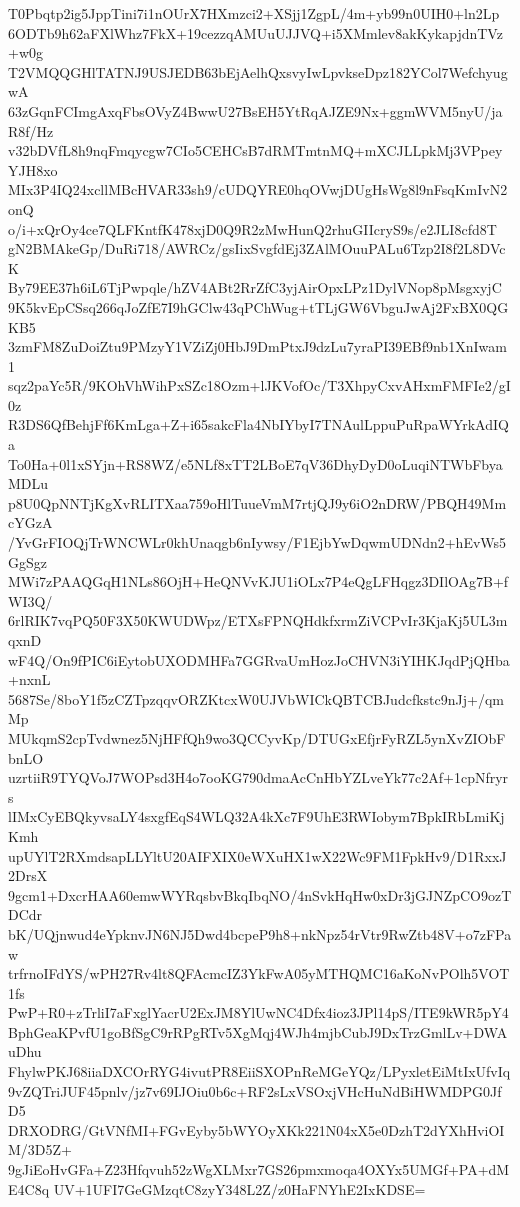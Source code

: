 T0Pbqtp2ig5JppTini7i1nOUrX7HXmzci2+XSjj1ZgpL/4m+yb99n0UIH0+ln2Lp
6ODTb9h62aFXlWhz7FkX+19cezzqAMUuUJJVQ+i5XMmlev8akKykapjdnTVz+w0g
T2VMQQGHlTATNJ9USJEDB63bEjAelhQxsvyIwLpvkseDpz182YCol7WefchyugwA
63zGqnFCImgAxqFbsOVyZ4BwwU27BsEH5YtRqAJZE9Nx+ggmWVM5nyU/jaR8f/Hz
v32bDVfL8h9nqFmqycgw7CIo5CEHCsB7dRMTmtnMQ+mXCJLLpkMj3VPpeyYJH8xo
MIx3P4IQ24xcllMBcHVAR33sh9/cUDQYRE0hqOVwjDUgHsWg8l9nFsqKmIvN2onQ
o/i+xQrOy4ce7QLFKntfK478xjD0Q9R2zMwHunQ2rhuGIIcryS9s/e2JLI8cfd8T
gN2BMAkeGp/DuRi718/AWRCz/gsIixSvgfdEj3ZAlMOuuPALu6Tzp2I8f2L8DVcK
By79EE37h6iL6TjPwpqle/hZV4ABt2RrZfC3yjAirOpxLPz1DylVNop8pMsgxyjC
9K5kvEpCSsq266qJoZfE7I9hGClw43qPChWug+tTLjGW6VbguJwAj2FxBX0QGKB5
3zmFM8ZuDoiZtu9PMzyY1VZiZj0HbJ9DmPtxJ9dzLu7yraPI39EBf9nb1XnIwam1
sqz2paYc5R/9KOhVhWihPxSZc18Ozm+lJKVofOc/T3XhpyCxvAHxmFMFIe2/gI0z
R3DS6QfBehjFf6KmLga+Z+i65sakcFla4NbIYbyI7TNAulLppuPuRpaWYrkAdIQa
To0Ha+0l1xSYjn+RS8WZ/e5NLf8xTT2LBoE7qV36DhyDyD0oLuqiNTWbFbyaMDLu
p8U0QpNNTjKgXvRLITXaa759oHlTuueVmM7rtjQJ9y6iO2nDRW/PBQH49MmcYGzA
/YvGrFIOQjTrWNCWLr0khUnaqgb6nIywsy/F1EjbYwDqwmUDNdn2+hEvWs5GgSgz
MWi7zPAAQGqH1NLs86OjH+HeQNVvKJU1iOLx7P4eQgLFHqgz3DIlOAg7B+fWI3Q/
6rlRIK7vqPQ50F3X50KWUDWpz/ETXsFPNQHdkfxrmZiVCPvIr3KjaKj5UL3mqxnD
wF4Q/On9fPIC6iEytobUXODMHFa7GGRvaUmHozJoCHVN3iYIHKJqdPjQHba+nxnL
5687Se/8boY1f5zCZTpzqqvORZKtcxW0UJVbWICkQBTCBJudcfkstc9nJj+/qmMp
MUkqmS2cpTvdwnez5NjHFfQh9wo3QCCyvKp/DTUGxEfjrFyRZL5ynXvZIObFbnLO
uzrtiiR9TYQVoJ7WOPsd3H4o7ooKG790dmaAcCnHbYZLveYk77c2Af+1cpNfryrs
lIMxCyEBQkyvsaLY4sxgfEqS4WLQ32A4kXc7F9UhE3RWIobym7BpkIRbLmiKjKmh
upUYlT2RXmdsapLLYltU20AIFXIX0eWXuHX1wX22Wc9FM1FpkHv9/D1RxxJ2DrsX
9gcm1+DxcrHAA60emwWYRqsbvBkqIbqNO/4nSvkHqHw0xDr3jGJNZpCO9ozTDCdr
bK/UQjnwud4eYpknvJN6NJ5Dwd4bcpeP9h8+nkNpz54rVtr9RwZtb48V+o7zFPaw
trfrnoIFdYS/wPH27Rv4lt8QFAcmcIZ3YkFwA05yMTHQMC16aKoNvPOlh5VOT1fs
PwP+R0+zTrliI7aFxglYacrU2ExJM8YlUwNC4Dfx4ioz3JPl14pS/ITE9kWR5pY4
BphGeaKPvfU1goBfSgC9rRPgRTv5XgMqj4WJh4mjbCubJ9DxTrzGmlLv+DWAuDhu
FhylwPKJ68iiaDXCOrRYG4ivutPR8EiiSXOPnReMGeYQz/LPyxletEiMtIxUfvIq
9vZQTriJUF45pnlv/jz7v69IJOiu0b6c+RF2sLxVSOxjVHcHuNdBiHWMDPG0JfD5
DRXODRG/GtVNfMI+FGvEyby5bWYOyXKk221N04xX5e0DzhT2dYXhHviOIM/3D5Z+
9gJiEoHvGFa+Z23Hfqvuh52zWgXLMxr7GS26pmxmoqa4OXYx5UMGf+PA+dME4C8q
UV+1UFI7GeGMzqtC8zyY348L2Z/z0HaFNYhE2IxKDSE=
